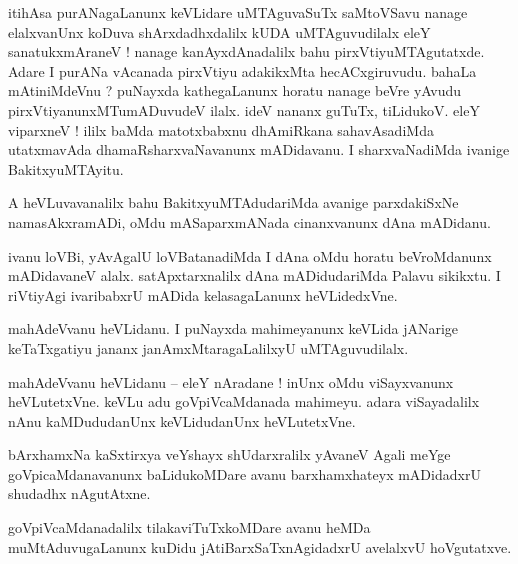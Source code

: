 \documentclass{article}
\begin{document}
\begin{mn}%
itihAsa purANagaLanunx keVLidare uMTAguvaSuTx saMtoVSavu nanage elalxvanUnx koDuva shArxdadhxdalilx 
kUDA uMTAguvudilalx eleY sanatukxmAraneV ! nanage kanAyxdAnadalilx bahu pirxVtiyuMTAgutatxde. Adare 
I purANa vAcanada pirxVtiyu adakikxMta hecACxgiruvudu. bahaLa mAtiniMdeVnu ? puNayxda kathegaLanunx 
horatu nanage beVre yAvudu pirxVtiyanunxMTumADuvudeV ilalx. ideV nananx guTuTx, tiLidukoV. eleY 
viparxneV ! ililx baMda matotxbabxnu dhAmiRkana sahavAsadiMda utatxmavAda dhamaRsharxvaNavanunx 
mADidavanu. I sharxvaNadiMda ivanige BakitxyuMTAyitu.
\end{mn}

\begin{mn}%
A heVLuvavanalilx bahu BakitxyuMTAdudariMda avanige parxdakiSxNe namasAkxramADi, oMdu mASaparxmANada 
cinanxvanunx dAna mADidanu.
\end{mn}

\begin{mn}%
ivanu loVBi, yAvAgalU loVBatanadiMda I dAna oMdu horatu beVroMdanunx mADidavaneV alalx. 
satApxtarxnalilx dAna mADidudariMda Palavu sikikxtu. I riVtiyAgi ivaribabxrU mADida kelasagaLanunx 
heVLidedxVne.
\end{mn}

\begin{mn}%
mahAdeVvanu heVLidanu. I puNayxda mahimeyanunx keVLida jANarige keTaTxgatiyu jananx 
janAmxMtaragaLalilxyU uMTAguvudilalx.
\end{mn}


\begin{mn}%
mahAdeVvanu heVLidanu -- eleY nAradane ! inUnx oMdu viSayxvanunx heVLutetxVne. keVLu adu 
goVpiVcaMdanada mahimeyu. adara viSayadalilx nAnu kaMDududanUnx keVLidudanUnx heVLutetxVne.
\end{mn}

\begin{mn}%
bArxhamxNa kaSxtirxya veYshayx shUdarxralilx yAvaneV Agali meYge goVpicaMdanavanunx baLidukoMDare 
avanu barxhamxhateyx mADidadxrU shudadhx nAgutAtxne.
\end{mn}

\begin{mn}%
goVpiVcaMdanadalilx tilakaviTuTxkoMDare avanu heMDa muMtAduvugaLanunx kuDidu jAtiBarxSaTxnAgidadxrU 
avelalxvU hoVgutatxve.
\end{mn}
\end{document}
